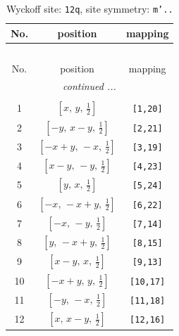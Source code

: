 \documentclass[fleqn,8pt]{jsarticle}
\begin{document}
\begin{longtable}{ccc}
\caption{Wyckoff site: {\tt 12q}, site symmetry: {\tt m'..}}
 \\
 \hline \hline
No. & position & mapping \\ \hline \endfirsthead

\multicolumn{2}{l}{\tablename\ \thetable{}} \\
 \hline \hline
No. & position & mapping \\ \hline \endhead

 \hline \hline
\multicolumn{2}{r}{\footnotesize\it continued ...} \\ \endfoot

 \hline \hline
\multicolumn{2}{r}{} \\ \endlastfoot

1 & $\left[ x,\, y,\, \frac{1}{2} \right]$ & {\tt [1,20]} \\ \hline
2 & $\left[ - y,\, x - y,\, \frac{1}{2} \right]$ & {\tt [2,21]} \\ \hline
3 & $\left[ - x + y,\, - x,\, \frac{1}{2} \right]$ & {\tt [3,19]} \\ \hline
4 & $\left[ x - y,\, - y,\, \frac{1}{2} \right]$ & {\tt [4,23]} \\ \hline
5 & $\left[ y,\, x,\, \frac{1}{2} \right]$ & {\tt [5,24]} \\ \hline
6 & $\left[ - x,\, - x + y,\, \frac{1}{2} \right]$ & {\tt [6,22]} \\ \hline
7 & $\left[ - x,\, - y,\, \frac{1}{2} \right]$ & {\tt [7,14]} \\ \hline
8 & $\left[ y,\, - x + y,\, \frac{1}{2} \right]$ & {\tt [8,15]} \\ \hline
9 & $\left[ x - y,\, x,\, \frac{1}{2} \right]$ & {\tt [9,13]} \\ \hline
10 & $\left[ - x + y,\, y,\, \frac{1}{2} \right]$ & {\tt [10,17]} \\ \hline
11 & $\left[ - y,\, - x,\, \frac{1}{2} \right]$ & {\tt [11,18]} \\ \hline
12 & $\left[ x,\, x - y,\, \frac{1}{2} \right]$ & {\tt [12,16]} \\
\end{longtable}
\renewcommand{\arraystretch}{1.2}
\end{document}

